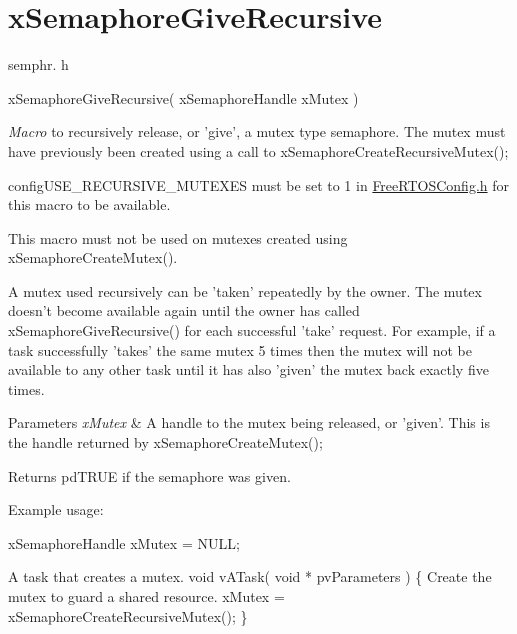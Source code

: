 \hypertarget{group__x_semaphore_give_recursive}{\section{x\-Semaphore\-Give\-Recursive}
\label{group__x_semaphore_give_recursive}
}
semphr. h 
\begin{DoxyPre}xSemaphoreGiveRecursive( xSemaphoreHandle xMutex )\end{DoxyPre}


{\itshape Macro} to recursively release, or 'give', a mutex type semaphore. The mutex must have previously been created using a call to x\-Semaphore\-Create\-Recursive\-Mutex();

config\-U\-S\-E\-\_\-\-R\-E\-C\-U\-R\-S\-I\-V\-E\-\_\-\-M\-U\-T\-E\-X\-E\-S must be set to 1 in \hyperlink{_free_r_t_o_s_config_8h_source}{Free\-R\-T\-O\-S\-Config.\-h} for this macro to be available.

This macro must not be used on mutexes created using x\-Semaphore\-Create\-Mutex().

A mutex used recursively can be 'taken' repeatedly by the owner. The mutex doesn't become available again until the owner has called x\-Semaphore\-Give\-Recursive() for each successful 'take' request. For example, if a task successfully 'takes' the same mutex 5 times then the mutex will not be available to any other task until it has also 'given' the mutex back exactly five times.


\begin{DoxyParams}{Parameters}
{\em x\-Mutex} & A handle to the mutex being released, or 'given'. This is the handle returned by x\-Semaphore\-Create\-Mutex();\\
\hline
\end{DoxyParams}
\begin{DoxyReturn}{Returns}
pd\-T\-R\-U\-E if the semaphore was given.
\end{DoxyReturn}
Example usage\-: 
\begin{DoxyPre}
 xSemaphoreHandle xMutex = NULL;\end{DoxyPre}



\begin{DoxyPre}A task that creates a mutex.
 void vATask( void * pvParameters )
 \{
Create the mutex to guard a shared resource.
    xMutex = xSemaphoreCreateRecursiveMutex();
 \}\end{DoxyPre}



